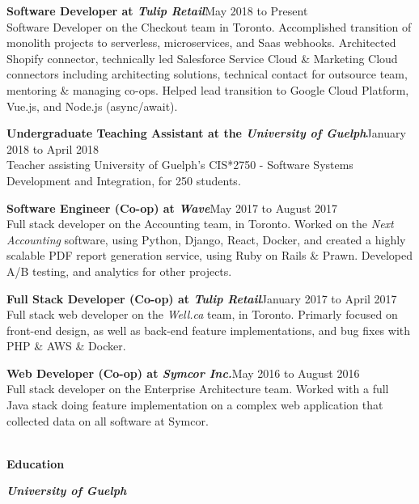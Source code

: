 \documentclass[9pt]{extarticle}
\begin{document}
{    \textbf{{\firamedium Software Developer at \textit{Tulip Retail}}}{\color{darkgrey}\hfill{\small{May 2018 to Present\\[5pt]}}
        Software Developer on the Checkout team in Toronto. Accomplished transition of monolith projects to serverless, microservices, and Saas webhooks. Architected Shopify connector, technically led Salesforce Service Cloud \& Marketing Cloud connectors including architecting solutions, technical contact for outsource team, mentoring \& managing co-ops. Helped lead transition to Google Cloud Platform, Vue.js, and Node.js (async/await).\\[-8pt]
    }

    \textbf{{\firamedium Undergraduate Teaching Assistant at the \textit{University of Guelph}}}{\color{darkgrey}\hfill{\small{January 2018 to April 2018\\[5pt]}}
        Teacher assisting University of Guelph's CIS*2750 - Software Systems Development and Integration, for 250 students.\\[-8pt]
    }

    \textbf{{\firamedium Software Engineer (Co-op) at \textit{Wave}}}{\color{darkgrey}\hfill{\small{May 2017 to August 2017\\[5pt]}}
        Full stack developer on the Accounting team, in Toronto. Worked on the \textit{Next Accounting} software, using Python, Django, React, Docker, and created a highly scalable PDF report generation service, using Ruby on Rails \& Prawn. Developed A/B testing, and analytics for other projects.\\[-8pt]
    }

    \textbf{{\firamedium Full Stack Developer (Co-op) at \textit{Tulip Retail}}}{\color{darkgrey}\hfill{\small{January 2017 to April 2017\\[5pt]}}
        Full stack web developer on the \textit{Well.ca} team, in Toronto. Primarly focused on front-end design, as well as back-end feature implementations, and bug fixes with PHP \& AWS \& Docker. \\[-8pt]
    }

    \textbf{{\firamedium Web Developer (Co-op) at \textit{Symcor Inc.}}}{\color{darkgrey}\hfill{\small{May 2016 to August 2016\\[5pt]}}
        Full stack developer on the Enterprise Architecture team. Worked with a full Java stack doing feature implementation on a complex web application that collected data on all software at Symcor. \\
    }

    {\color{lightgrey}{\centerline{\rule{17cm}{0.4pt}}}}
    \begin{LARGE}
        \color{em-light}\textbf{\\[-5pt]{\firamedium Education}\\[-8pt]}
    \end{LARGE}

    \textit{\textbf{{\firamedium University of Guelph}}}{}
}
\end{document}
